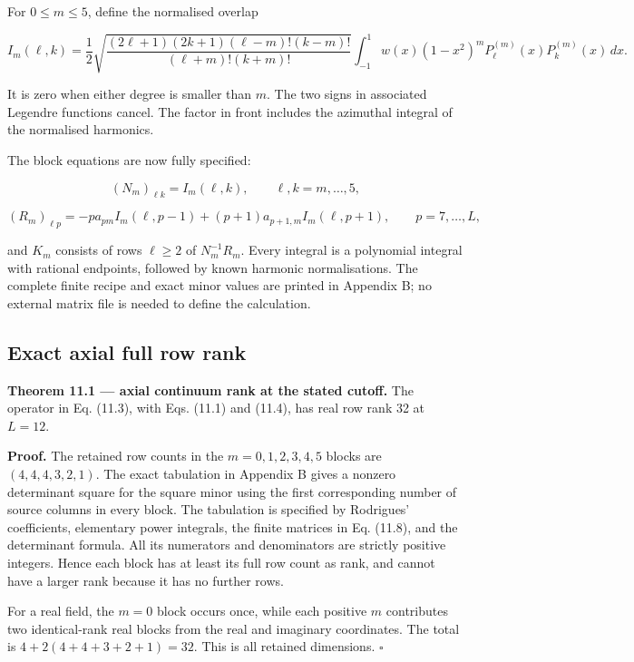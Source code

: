 \documentclass[
  11pt,
  a4paper]{article}
\begin{document}
For \(0\le m\le5\), define the normalised overlap

\[
I_m(\ell,k)=\frac12
\sqrt{\frac{(2\ell+1)(2k+1)(\ell-m)!(k-m)!}
{(\ell+m)!(k+m)!}}
\int_{-1}^1 w(x)(1-x^2)^mP_\ell^{(m)}(x)P_k^{(m)}(x)\,dx.
\tag{11.7}
\]

It is zero when either degree is smaller than \(m\). The two signs in associated Legendre functions cancel. The factor in front includes the azimuthal integral of the normalised harmonics.

The block equations are now fully specified:

\[
(N_m)_{\ell k}=I_m(\ell,k),\qquad \ell,k=m,\ldots,5,
\]

\[
(R_m)_{\ell p}
=-p a_{pm}I_m(\ell,p-1)+(p+1)a_{p+1,m}I_m(\ell,p+1),
\qquad p=7,\ldots,L,
\tag{11.8}
\]

and \(K_m\) consists of rows \(\ell\ge2\) of \(N_m^{-1}R_m\). Every integral is a polynomial integral with rational endpoints, followed by known harmonic normalisations. The complete finite recipe and exact minor values are printed in Appendix B; no external matrix file is needed to define the calculation.

\hypertarget{exact-axial-full-row-rank}{%
\subsection{Exact axial full row rank}\label{exact-axial-full-row-rank}}

\textbf{Theorem 11.1 --- axial continuum rank at the stated cutoff.} The operator in Eq. (11.3), with Eqs. (11.1) and (11.4), has real row rank 32 at \(L=12\).

\textbf{Proof.} The retained row counts in the \(m=0,1,2,3,4,5\) blocks are \((4,4,4,3,2,1)\). The exact tabulation in Appendix B gives a nonzero determinant square for the square minor using the first corresponding number of source columns in every block. The tabulation is specified by Rodrigues' coefficients, elementary power integrals, the finite matrices in Eq. (11.8), and the determinant formula. All its numerators and denominators are strictly positive integers. Hence each block has at least its full row count as rank, and cannot have a larger rank because it has no further rows.

For a real field, the \(m=0\) block occurs once, while each positive \(m\) contributes two identical-rank real blocks from the real and imaginary coordinates. The total is
\(4+2(4+4+3+2+1)=32\). This is all retained dimensions. \(\square\)
\end{document}
